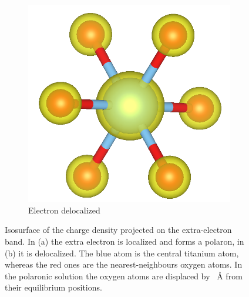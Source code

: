 \begin{figure}
\begin{subfigure}[b]{0.49\textwidth}
        \includegraphics[width=\textwidth]{figures/PARCHG_delocalized}
        \caption{Electron delocalized}
        \label{fig:delocalized_iso}
    \end{subfigure}
    \caption{Isosurface of the charge density projected on the extra-electron band. In (a) the extra electron is localized and forms a polaron, in (b) it is delocalized. The blue atom is the central titanium atom, whereas the red ones are the nearest-neighbours oxygen atoms. In the polaronic solution the oxygen atoms are displaced by \SI{}{\angstrom} from their equilibrium positions.
    }
    \label{fig:isosurfaces_center}
\end{figure}
